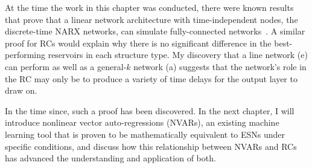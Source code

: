 At the time the work in this chapter was conducted, there were known
results that prove that a linear network architecture with
time-independent nodes, the discrete-time NARX networks, can simulate
fully-connected networks~\cite{siegelmann1997}. A similar proof for RCs
would explain why there is no significant difference in the best-performing
reservoirs in each structure type. My discovery that a line network
(e) can perform as well as a general-$k$ network (a) suggests that the
network's role in the RC may only be to produce a variety of time
delays for the output layer to draw on.

In the time since, such a proof has been discovered. In the next
chapter, I will introduce nonlinear vector auto-regressions (NVARs),
an existing machine learning tool that is proven to be mathematically
equivalent to ESNs under specific conditions, and discuss how this
relationship between NVARs and RCs has advanced the understanding and
application of both.
